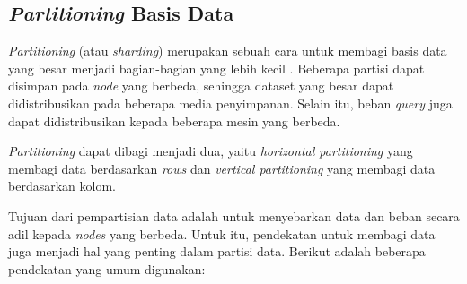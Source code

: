 \subsection{\textit{Partitioning} Basis Data}

\textit{Partitioning} (atau \textit{sharding}) merupakan sebuah cara untuk membagi basis data yang besar menjadi bagian-bagian yang lebih kecil \parencite{dataIntensiveApplications}. Beberapa partisi dapat disimpan pada \textit{node} yang berbeda, sehingga dataset yang besar dapat didistribusikan pada beberapa media penyimpanan. Selain itu, beban \textit{query} juga dapat didistribusikan kepada beberapa mesin yang berbeda.

\textit{Partitioning} dapat dibagi menjadi dua, yaitu \textit{horizontal partitioning} yang membagi data berdasarkan \textit{rows} dan \textit{vertical partitioning} yang membagi data berdasarkan kolom.

Tujuan dari pempartisian data adalah untuk menyebarkan data dan beban secara adil kepada \textit{nodes} yang berbeda. Untuk itu, pendekatan untuk membagi data juga menjadi hal yang penting dalam partisi data. Berikut adalah beberapa pendekatan yang umum digunakan:

